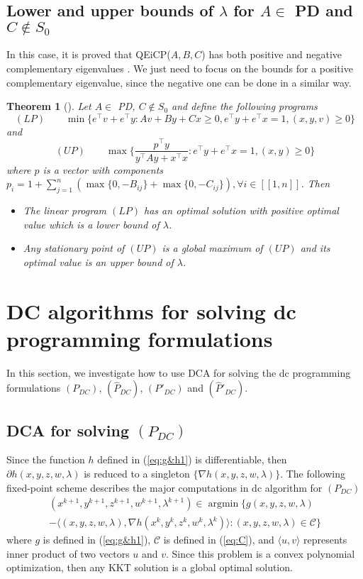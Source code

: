 \documentclass[3p]{elsarticle}
\DeclareMathOperator{\argmin}{argmin}
\newcommand{\IntEnt}[1]{\left[\!\left[#1\right]\!\right]}
\newtheorem{thm}{Theorem}
\begin{document}
\subsection{Lower and upper bounds of $\lambda$ for $A\in$ PD and $C\notin S_0$}\label{subsec:CnotinS0}
In this case, it is proved that QEiCP($A,B,C$) has both positive and negative complementary eigenvalues \cite{Bras16}. We just need to focus on the bounds for a positive complementary eigenvalue, since the negative one can be done in a similar way. 
\begin{thm}[\cite{Iusem16}]
	Let $A\in$ PD, $C\notin S_0$ and define the following programs
	$$(LP) \qquad \min\{e^{\top}v + e^{\top}y : Av + By + Cx \geq 0, e^{\top}y + e^{\top}x = 1, (x,y,v) \geq 0\}$$ 
	and
	$$(UP) \qquad \max\{ \frac{p^{\top}y}{y^{\top}Ay + x^{\top}x} : e^{\top}y + e^{\top}x = 1, (x,y)\geq 0\}$$
	where $p$ is a vector with components $p_i = 1+\sum_{j=1}^{n}(\max\{0,−B_{ij}\}+\max\{0,−C_{ij}\}), \forall i\in \IntEnt{1,n}$. Then  
	\begin{itemize}
		\item[(i)] The linear program $(LP)$ has an optimal solution with positive optimal value which is a lower bound of $\lambda$.
		\item[(ii)] Any stationary point of $(UP)$ is a global maximum of $(UP)$ and its optimal value is an upper bound of $\lambda$.
	\end{itemize}
\end{thm}

\section{DC algorithms for solving dc programming formulations}\label{sec:dcas}
In this section, we investigate how to use DCA for solving the dc programming formulations $(P_{DC})$, $(\hat{P}_{DC})$, $(P'_{DC})$ and $(\hat{P}'_{DC})$.  
\subsection{DCA for solving $(P_{DC})$}
Since the function $h$ defined in (\ref{eq:g&h1}) is differentiable, then $\partial h(x,y,z,w,\lambda)$ is reduced to a singleton $\{\nabla h(x,y,z,w,\lambda)\}$. The following fixed-point scheme describes the major computations in dc algorithm for $(P_{DC})$ \begin{equation}\label{prob:dcaforpdc}
\begin{array}{l}
(x^{k+1},y^{k+1},z^{k+1},w^{k+1},\lambda^{k+1}) \in \argmin\{g(x,y,z,w,\lambda) \\
-\langle (x,y,z,w,\lambda),\nabla h(x^k,y^k,z^k,w^k,\lambda^k)\rangle: (x,y,z,w,\lambda)\in \mathcal{C}\}
\end{array}
\end{equation}
where $g$ is defined in (\ref{eq:g&h1}), $\mathcal{C}$ is defined in (\ref{eq:C}), and $\langle u,v \rangle$ represents inner product of two vectors $u$ and $v$. Since this problem is a convex polynomial optimization, then any KKT solution is a global optimal solution. 
\end{document}
